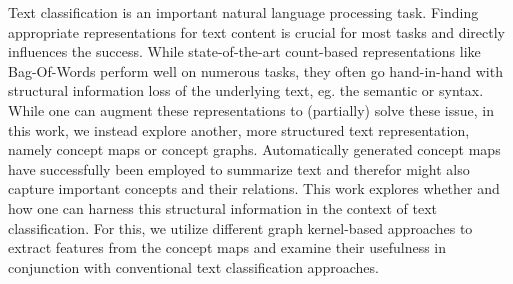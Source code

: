 Text classification is an important natural language processing task. 
Finding appropriate representations for text content is crucial for most tasks and directly influences the success.
While state-of-the-art count-based representations like Bag-Of-Words perform well on numerous tasks, they often go hand-in-hand with structural information loss of the underlying text, eg. the semantic or syntax.
While one can augment these representations to (partially) solve these issue, in this work, we instead explore another, more structured text representation, namely concept maps or concept graphs.
Automatically generated concept maps have successfully been employed to summarize text and therefor might also capture important concepts and their relations.
This work explores whether and how one can harness this structural information in the context of text classification.
For this, we utilize different graph kernel-based approaches to extract features from the concept maps and examine their usefulness in conjunction with conventional text classification approaches.
